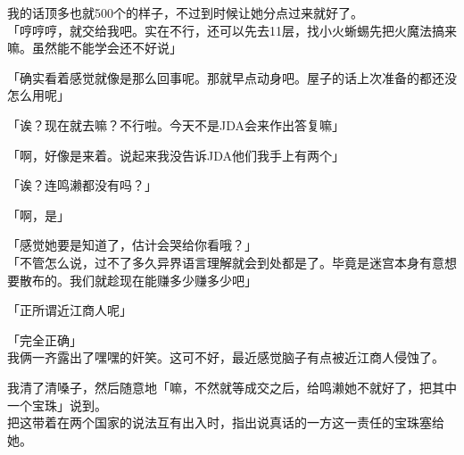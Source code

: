 我的话顶多也就500个的样子，不过到时候让她分点过来就好了。\\

「哼哼哼，就交给我吧。实在不行，还可以先去11层，找小火蜥蜴先把火魔法搞来嘛。虽然能不能学会还不好说」

「确实看着感觉就像是那么回事呢。那就早点动身吧。屋子的话上次准备的都还没怎么用呢」

「诶？现在就去嘛？不行啦。今天不是JDA会来作出答复嘛」

「啊，好像是来着。说起来我没告诉JDA他们我手上有两个」

「诶？连鸣濑都没有吗？」

「啊，是」

「感觉她要是知道了，估计会哭给你看哦？」\\

「不管怎么说，过不了多久异界语言理解就会到处都是了。毕竟是迷宫本身有意想要散布的。我们就趁现在能赚多少赚多少吧」

「正所谓近江商人呢」

「完全正确」\\

我俩一齐露出了嘿嘿的奸笑。这可不好，最近感觉脑子有点被近江商人侵蚀了。

我清了清嗓子，然后随意地「嘛，不然就等成交之后，给鸣濑她不就好了，把其中一个宝珠」说到。\\

把这带着在两个国家的说法互有出入时，指出说真话的一方这一责任的宝珠塞给她。

